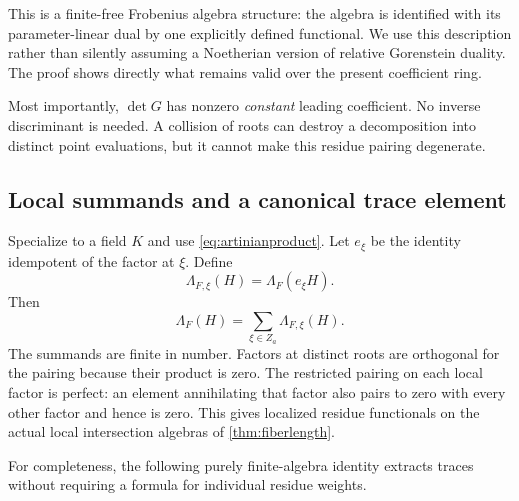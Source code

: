 \documentclass[11pt,oneside]{article}
\numberwithin{equation}{section}
\theoremstyle{definition}
\theoremstyle{remark}\newtheorem{remark}[theorem]{Remark}
\begin{document}
This is a finite-free Frobenius algebra structure: the algebra is identified with its parameter-linear dual by one explicitly defined functional. We use this description rather than silently assuming a Noetherian version of relative Gorenstein duality. The proof shows directly what remains valid over the present coefficient ring.

Most importantly, \(\det G\) has nonzero \emph{constant} leading coefficient. No inverse discriminant is needed. A collision of roots can destroy a decomposition into distinct point evaluations, but it cannot make this residue pairing degenerate.

\subsection{Local summands and a canonical trace element}
Specialize to a field \(K\) and use \eqref{eq:artinianproduct}. Let \(e_\xi\) be the identity idempotent of the factor at \(\xi\). Define
\[
 \Lambda_{F,\xi}(H)=\Lambda_F(e_\xi H).
\]
Then
\begin{equation}\label{eq:localresiduesum}
 \Lambda_F(H)=\sum_{\xi\in Z_a}\Lambda_{F,\xi}(H).
\end{equation}
The summands are finite in number. Factors at distinct roots are orthogonal for the pairing because their product is zero. The restricted pairing on each local factor is perfect: an element annihilating that factor also pairs to zero with every other factor and hence is zero. This gives localized residue functionals on the actual local intersection algebras of \cref{thm:fiberlength}.

For completeness, the following purely finite-algebra identity extracts traces without requiring a formula for individual residue weights.
\end{document}
